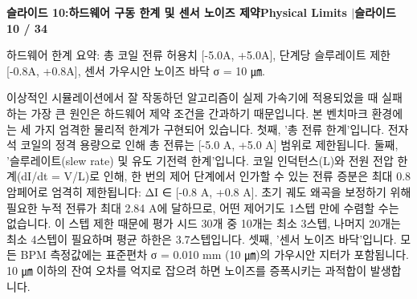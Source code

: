 \documentclass[11pt,a4paper]{article}
\begin{document}
\clearpage
\hypertarget{slide.10}{}
{}
\noindent\begin{tcolorbox}[colback=navy,colframe=navy,left=6pt,right=6pt,top=3pt,bottom=3pt,boxrule=0pt,arc=2pt]
{\large\bfseries\color{white}슬라이드 10:\enspace 하드웨어 구동 한계 및 센서 노이즈 제약}\hfill{\footnotesize\bfseries\color{white!85!lightbg}Physical Limits \enspace$|$\enspace 슬라이드 10 / 34}
\end{tcolorbox}
\vspace{0.2em}
\begin{tcolorbox}[colback=lightbg,colframe=bordergray,title={\footnotesize\bfseries\color{darkgray}슬라이드 시각 구성 요약},fontupper=\small,left=6pt,right=6pt,top=2.5pt,bottom=2.5pt,boxrule=0.6pt,arc=2.5pt]
하드웨어 한계 요약: 총 코일 전류 허용치 [-5.0A, +5.0A], 단계당 슬루레이트 제한 [-0.8A, +0.8A], 센서 가우시안 노이즈 바닥 σ = 10 ㎛.
\end{tcolorbox}
\vspace{0.2em}
\begin{tcolorbox}[colback=white,colframe=primaryblue,title={\footnotesize\bfseries\color{white}발표자 구두 대본 (Spoken Script)},fontupper=\small,left=6pt,right=6pt,top=3pt,bottom=3pt,boxrule=0.8pt,arc=2.5pt]
이상적인 시뮬레이션에서 잘 작동하던 알고리즘이 실제 가속기에 적용되었을 때 실패하는 가장 큰 원인은 하드웨어 제약 조건을 간과하기 때문입니다. 본 벤치마크 환경에는 세 가지 엄격한 물리적 한계가 구현되어 있습니다. 첫째, '총 전류 한계'입니다. 전자석 코일의 정격 용량으로 인해 총 전류는 [-5.0 A, +5.0 A] 범위로 제한됩니다. 둘째, '슬루레이트(slew rate) 및 유도 기전력 한계'입니다. 코일 인덕턴스(L)와 전원 전압 한계(dI/dt = V/L)로 인해, 한 번의 제어 단계에서 인가할 수 있는 전류 증분은 최대 0.8 암페어로 엄격히 제한됩니다: ΔI ∈ [-0.8 A, +0.8 A]. 초기 궤도 왜곡을 보정하기 위해 필요한 누적 전류가 최대 2.84 A에 달하므로, 어떤 제어기도 1스텝 만에 수렴할 수는 없습니다. 이 스텝 제한 때문에 평가 시드 30개 중 10개는 최소 3스텝, 나머지 20개는 최소 4스텝이 필요하며 평균 하한은 3.7스텝입니다. 셋째, '센서 노이즈 바닥'입니다. 모든 BPM 측정값에는 표준편차 σ = 0.010 mm (10 ㎛)의 가우시안 지터가 포함됩니다. 10 ㎛ 이하의 잔여 오차를 억지로 잡으려 하면 노이즈를 증폭시키는 과적합이 발생합니다.
\end{tcolorbox}
\vspace{0.2em}
\end{document}
